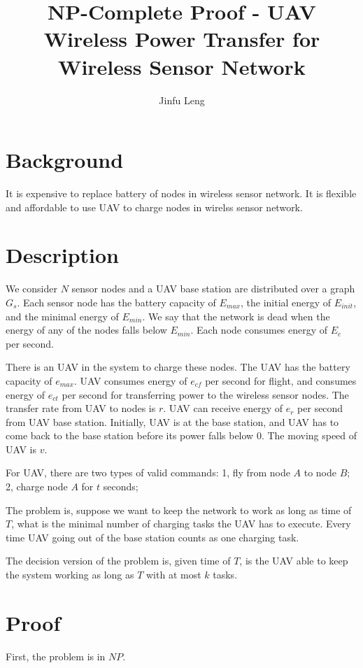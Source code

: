 
\title{NP-Complete Proof - UAV Wireless Power Transfer for Wireless Sensor Network}
\author{Jinfu Leng}
\maketitle
\section{Background}
It is expensive to replace battery of nodes in wireless sensor network.
It is flexible and affordable to use UAV to charge nodes in wirelss sensor network.
\section{Description}
We consider $N$ sensor nodes and a UAV base station are distributed over a graph $G_s$. Each sensor node has the battery capacity of $E_{max}$, the initial energy of $E_{init}$, and the minimal energy of $E_{min}$. We say that the network is dead when the energy of any of the nodes falls below $E_{min}$. Each node consumes energy of $E_{c}$ per second.

There is an UAV in the system to charge these nodes. The UAV has the battery capacity of $e_{max}$. UAV consumes energy of $e_{cf}$ per second for flight, and consumes energy of $e_{ct}$ per second for transferring power to the wireless sensor nodes. The transfer rate from UAV to nodes is $r$. UAV can receive energy of $e_r$ per second from UAV base station. Initially, UAV is at the base station, and UAV has to come back to the base station before its power falls below $0$. The moving speed of UAV is $v$.

For UAV, there are two types of valid commands:
1, fly from node $A$ to node $B$;
2, charge node $A$ for $t$ seconds;

The problem is, suppose we want to keep the network to work as long as time of $T$, what is the minimal number of charging tasks the UAV has to execute. Every time UAV going out of the base station counts as one charging task.

The decision version of the problem is, given time of $T$, is the UAV able to keep the system working as long as $T$ with at most $k$ tasks.
\section{Proof}

First, the problem is in $NP$.

